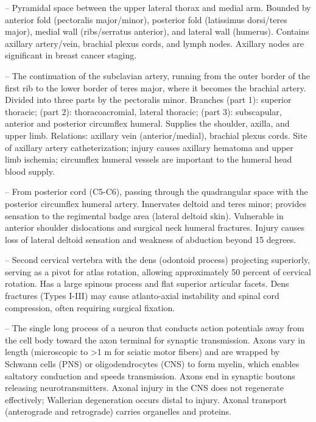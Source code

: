 -- Pyramidal space between the upper lateral thorax and medial arm. Bounded by anterior fold (pectoralis major/minor), posterior fold (latissimus dorsi/teres major), medial wall (ribs/serratus anterior), and lateral wall (humerus). Contains axillary artery/vein, brachial plexus cords, and lymph nodes. Axillary nodes are significant in breast cancer staging.

-- The continuation of the subclavian artery, running from the outer border of the first rib to the lower border of teres major, where it becomes the brachial artery. Divided into three parts by the pectoralis minor. Branches (part 1): superior thoracic; (part 2): thoracoacromial, lateral thoracic; (part 3): subscapular, anterior and posterior circumflex humeral. Supplies the shoulder, axilla, and upper limb. Relations: axillary vein (anterior/medial), brachial plexus cords. Site of axillary artery catheterization; injury causes axillary hematoma and upper limb ischemia; circumflex humeral vessels are important to the humeral head blood supply.

-- From posterior cord (C5-C6), passing through the quadrangular space with the posterior circumflex humeral artery. Innervates deltoid and teres minor; provides sensation to the regimental badge area (lateral deltoid skin). Vulnerable in anterior shoulder dislocations and surgical neck humeral fractures. Injury causes loss of lateral deltoid sensation and weakness of abduction beyond 15 degrees.

-- Second cervical vertebra with the dens (odontoid process) projecting superiorly, serving as a pivot for atlas rotation, allowing approximately 50 percent of cervical rotation. Has a large spinous process and flat superior articular facets. Dens fractures (Types I-III) may cause atlanto-axial instability and spinal cord compression, often requiring surgical fixation.

-- The single long process of a neuron that conducts action potentials away from the cell body toward the axon terminal for synaptic transmission. Axons vary in length (microscopic to >1 m for sciatic motor fibers) and are wrapped by Schwann cells (PNS) or oligodendrocytes (CNS) to form myelin, which enables saltatory conduction and speeds transmission. Axons end in synaptic boutons releasing neurotransmitters. Axonal injury in the CNS does not regenerate effectively; Wallerian degeneration occurs distal to injury. Axonal transport (anterograde and retrograde) carries organelles and proteins.

